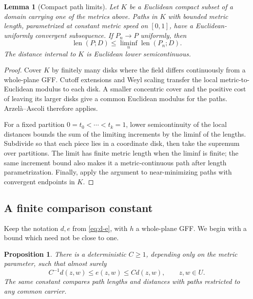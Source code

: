 \documentclass[11pt]{article}
\newtheorem{proposition}[theorem]{Proposition}
\newtheorem{lemma}[theorem]{Lemma}
\theoremstyle{definition}
\theoremstyle{remark}
\newcommand{\len}{\operatorname{len}}
\begin{document}
\begin{lemma}[Compact path limits]\label{lem:compact}
Let $K$ be a Euclidean compact subset of a domain carrying one of
the metrics above. Paths in $K$ with bounded metric length,
parametrized at constant metric speed on $[0,1]$, have a
Euclidean-uniformly convergent subsequence. If $P_n\to P$ uniformly,
then
\[
                  \len(P;D)\le\liminf_n\len(P_n;D).
\]
The distance internal to $K$ is Euclidean lower semicontinuous.
\end{lemma}
\begin{proof}
Cover $K$ by finitely many disks where the field differs continuously
from a whole-plane GFF. Cutoff extensions and Weyl scaling transfer
the local metric-to-Euclidean modulus to each disk. A smaller
concentric cover and the positive cost of leaving its larger disks
give a common Euclidean modulus for the paths. Arzel\`a--Ascoli
therefore applies.

For a fixed partition $0=t_0<\cdots<t_k=1$, lower semicontinuity
of the local distances bounds the sum of the limiting increments
by the liminf of the lengths. Subdivide so that each piece lies in
a coordinate disk, then take the supremum over partitions.
The limit has finite metric length when the liminf is finite;
the same increment bound also makes it a metric-continuous path
after length parametrization. Finally, apply the argument to
near-minimizing paths with convergent endpoints in $K$.
\end{proof}

\subsection{A finite comparison constant}\label{sec:rough}
Keep the notation $d,e$ from \eqref{eq:d-e}, with $h$ a whole-plane
GFF. We begin with a bound which need not be close to one.

\begin{proposition}\label{prop:bilip}
There is a deterministic $C\ge1$, depending only on the metric
parameter, such that almost surely
\begin{equation}\label{eq:bilip}
              C^{-1}d(z,w)\le e(z,w)\le Cd(z,w),
                         \qquad z,w\in U.
\end{equation}
The same constant compares path lengths and distances with paths
restricted to any common carrier.
\end{proposition}
\end{document}

